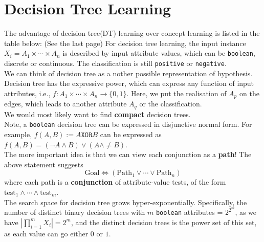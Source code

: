 \documentclass[12pt]{article}
\theoremstyle{definition}
\begin{document}
\section{Decision Tree Learning}
The advantage of decision tree(DT) learning over concept learning is listed in the table below: (See the last page)
For decision tree learning, the input instance $X_i=A_1\times \cdots\times A_n$ is described by input attribute values, which can be \texttt{boolean}, discrete or continuous. The classification is still \texttt{positive} or \texttt{negative}.\\
We can think of decision tree as a nother possible representation of hypothesis.\\
Decision tree has the expressive power, which can express any function of input attributes, i.e., $f: A_1\times\cdots\times A_n\to \{0,1\}$. Here, we put the realisation of $A_p$ on the edges, which leads to another attribute $A_q$ or the classification.\\
We would most likely want to find \textbf{compact} decision trees.\\
Note, a \texttt{boolean} decision tree can be expressed in disjunctive normal form. For example, $f(A,B):=A \texttt{XOR} B$ can be expressed as $f(A,B)=(\neg A\land B)\lor (A\land \neq B)$.\\
The more important idea is that we can view each conjunction as a \textbf{path}! The above statement suggests
\[
\text{Goal} \Leftrightarrow (\text{Path}_1\lor\cdots\lor \text{Path}_n)
\]
where each path is a \textbf{conjunction} of attribute-value tests, of the form $\text{test}_1\land \cdots\land \text{test}_m$.\\
The search space for decision tree grows hyper-exponentially. Specifically, the number of distinct binary decision trees with $m$ \texttt{boolean} attributes = $2^{2^m}$, as we have $|\prod_{i=1}^m X_i|=2^m$, and the distinct decision trees is the power set of this set, as each value can go either $0$ or $1$.\\
\end{document}

